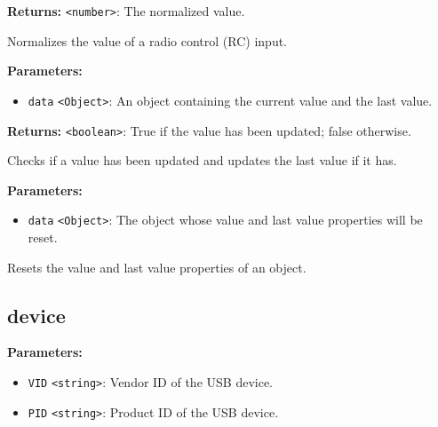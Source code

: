 \documentclass[12pt,a4paper]{article}
\begin{document}
\noindent \textbf{Returns:} \texttt{<number>}: The normalized value.

\noindent Normalizes the value of a radio control (RC) input.

\vspace{5mm}
\noindent {}


\noindent \textbf{Parameters:}
\begin{itemize}
  \item \texttt{data} \texttt{<Object>}: An object containing the current value and the last value.
\end{itemize}

\noindent \textbf{Returns:} \texttt{<boolean>}: True if the value has been updated; false otherwise.

\noindent Checks if a value has been updated and updates the last value if it has.

\vspace{5mm}
\noindent {}


\noindent \textbf{Parameters:}
\begin{itemize}
  \item \texttt{data} \texttt{<Object>}: The object whose value and last value properties will be reset.
\end{itemize}

\noindent Resets the value and last value properties of an object.


\subsection{device}
\vspace{5mm}
\noindent {}


\noindent \textbf{Parameters:}
\begin{itemize}
  \item \texttt{VID} \texttt{<string>}: Vendor ID of the USB device.
  \item \texttt{PID} \texttt{<string>}: Product ID of the USB device.
\end{itemize}
\end{document}

